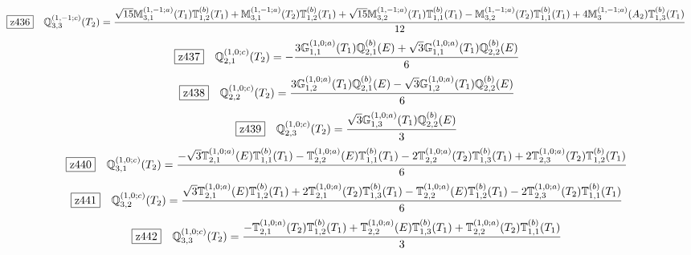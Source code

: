 \documentclass[fleqn,10pt,landscape]{jsarticle}
\begin{document}
\begin{dmath*}
\hspace*{3mm}\fbox{z436}\quad \mathbb{Q}_{3,3}^{(1,-1;c)}(T_{2})=\frac{\sqrt{15} \mathbb{M}_{3,1}^{(1,-1;a)}(T_{1}) \mathbb{T}_{1,2}^{(b)}(T_{1}) + \mathbb{M}_{3,1}^{(1,-1;a)}(T_{2}) \mathbb{T}_{1,2}^{(b)}(T_{1}) + \sqrt{15} \mathbb{M}_{3,2}^{(1,-1;a)}(T_{1}) \mathbb{T}_{1,1}^{(b)}(T_{1}) - \mathbb{M}_{3,2}^{(1,-1;a)}(T_{2}) \mathbb{T}_{1,1}^{(b)}(T_{1}) + 4 \mathbb{M}_{3}^{(1,-1;a)}(A_{2}) \mathbb{T}_{1,3}^{(b)}(T_{1})}{12}
\end{dmath*}
\begin{dmath*}
\hspace*{3mm}\fbox{z437}\quad \mathbb{Q}_{2,1}^{(1,0;c)}(T_{2})=- \frac{3 \mathbb{G}_{1,1}^{(1,0;a)}(T_{1}) \mathbb{Q}_{2,1}^{(b)}(E) + \sqrt{3} \mathbb{G}_{1,1}^{(1,0;a)}(T_{1}) \mathbb{Q}_{2,2}^{(b)}(E)}{6}
\end{dmath*}
\begin{dmath*}
\hspace*{3mm}\fbox{z438}\quad \mathbb{Q}_{2,2}^{(1,0;c)}(T_{2})=\frac{3 \mathbb{G}_{1,2}^{(1,0;a)}(T_{1}) \mathbb{Q}_{2,1}^{(b)}(E) - \sqrt{3} \mathbb{G}_{1,2}^{(1,0;a)}(T_{1}) \mathbb{Q}_{2,2}^{(b)}(E)}{6}
\end{dmath*}
\begin{dmath*}
\hspace*{3mm}\fbox{z439}\quad \mathbb{Q}_{2,3}^{(1,0;c)}(T_{2})=\frac{\sqrt{3} \mathbb{G}_{1,3}^{(1,0;a)}(T_{1}) \mathbb{Q}_{2,2}^{(b)}(E)}{3}
\end{dmath*}
\begin{dmath*}
\hspace*{3mm}\fbox{z440}\quad \mathbb{Q}_{3,1}^{(1,0;c)}(T_{2})=\frac{- \sqrt{3} \mathbb{T}_{2,1}^{(1,0;a)}(E) \mathbb{T}_{1,1}^{(b)}(T_{1}) - \mathbb{T}_{2,2}^{(1,0;a)}(E) \mathbb{T}_{1,1}^{(b)}(T_{1}) - 2 \mathbb{T}_{2,2}^{(1,0;a)}(T_{2}) \mathbb{T}_{1,3}^{(b)}(T_{1}) + 2 \mathbb{T}_{2,3}^{(1,0;a)}(T_{2}) \mathbb{T}_{1,2}^{(b)}(T_{1})}{6}
\end{dmath*}
\begin{dmath*}
\hspace*{3mm}\fbox{z441}\quad \mathbb{Q}_{3,2}^{(1,0;c)}(T_{2})=\frac{\sqrt{3} \mathbb{T}_{2,1}^{(1,0;a)}(E) \mathbb{T}_{1,2}^{(b)}(T_{1}) + 2 \mathbb{T}_{2,1}^{(1,0;a)}(T_{2}) \mathbb{T}_{1,3}^{(b)}(T_{1}) - \mathbb{T}_{2,2}^{(1,0;a)}(E) \mathbb{T}_{1,2}^{(b)}(T_{1}) - 2 \mathbb{T}_{2,3}^{(1,0;a)}(T_{2}) \mathbb{T}_{1,1}^{(b)}(T_{1})}{6}
\end{dmath*}
\begin{dmath*}
\hspace*{3mm}\fbox{z442}\quad \mathbb{Q}_{3,3}^{(1,0;c)}(T_{2})=\frac{- \mathbb{T}_{2,1}^{(1,0;a)}(T_{2}) \mathbb{T}_{1,2}^{(b)}(T_{1}) + \mathbb{T}_{2,2}^{(1,0;a)}(E) \mathbb{T}_{1,3}^{(b)}(T_{1}) + \mathbb{T}_{2,2}^{(1,0;a)}(T_{2}) \mathbb{T}_{1,1}^{(b)}(T_{1})}{3}
\end{dmath*}
\end{document}
